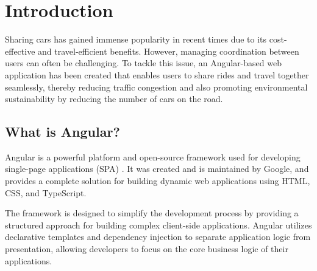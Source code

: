 \documentclass{article}
\title{\papertitle}
\begin{document}
%
\capstartfalse
\maketitle
\capstarttrue

\tableofcontents

%
\begin{abstract}
    In this write-up, we will be discussing Angular, a framework and platform that enables the development of client-side single-page applications (SPA) through the use of TypeScript and HTML. Additionally, we will provide a hands-on demonstration of how to create a web application using Angular, specifically one that allows for car sharing and ride-sharing. The platform enables users to publish travel routes and fares, while others can join in. However, it's important to mention that the application's implementation is based on dummy data and can only be accessed through the frontend.
\end{abstract}
%

\section{Introduction}\label{sec:introduction}

    Sharing cars has gained immense popularity in recent times due to its cost-effective and travel-efficient benefits. However, managing coordination between users can often be challenging. To tackle this issue, an Angular-based web application has been created that enables users to share rides and travel together seamlessly, thereby reducing traffic congestion and also promoting environmental sustainability by reducing the number of cars on the road.

\subsection{What is Angular?}
    Angular is a powerful platform and open-source framework used for developing single-page applications (SPA) \cite{angularDocumentation,angularWikipedia}. It was created and is maintained by Google, and provides a complete solution for building dynamic web applications using HTML, CSS, and TypeScript.

    The framework is designed to simplify the development process by providing a structured approach for building complex client-side applications. Angular utilizes declarative templates and dependency injection to separate application logic from presentation, allowing developers to focus on the core business logic of their applications.
\end{document}
